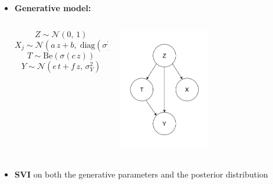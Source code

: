 \documentclass[10pt]{beamer}
\begin{document}
 \begin{frame}{}
     \begin{itemize}
         \item \textbf{Generative model:}
         \begin{columns}
              \begin{column}{0.75\textwidth}
                  \begin{equation*}
                    Z \sim \mathcal{N}(0,\,1)
                  \end{equation*}
                  \begin{equation*}
                    X_j \sim \mathcal{N}(a\,z + b,\; \text{diag}(\sigma_X^2))
                  \end{equation*}
                  \begin{equation*}
                    T \sim \mathrm{Be}(\sigma(c\,z))
                  \end{equation*}
                  \begin{equation*}
                    Y \sim \mathcal{N}(e\,t + f\,z,\,\sigma_Y^2)
                  \end{equation*}
              \end{column}
              \begin{column}{0.5\textwidth}
                  \includegraphics[width=0.5\textwidth]{images/model.jpg}
              \end{column}
         \end{columns}

         \item \textbf{SVI} on both the generative parameters and the posterior distribution
     \end{itemize}
 \end{frame}
\end{document}
